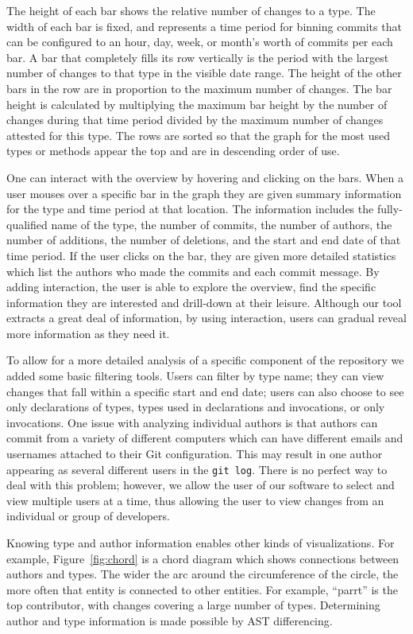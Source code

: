 The height of each bar shows the relative number of changes to a type. The width of each bar is fixed, and represents a time period for binning commits that can be configured to an hour, day, week, or month's worth of commits per each bar.  A bar that completely fills its row vertically is the period with the largest number of changes to that type in the visible date range. The height of the other bars in the row are in proportion to the maximum number of changes. The bar height is calculated by multiplying the maximum bar height by the number of changes during that time period divided by the maximum number of changes attested for this type. The rows are sorted so that the graph for the most used types or methods appear the top and are in descending order of use.

One can interact with the overview by hovering and clicking on the bars. When a user mouses over a specific bar in the graph they are given summary information for the type and time period at that location. The information includes the fully-qualified name of the type, the number of commits, the number of authors, the number of additions, the number of deletions, and the start and end date of that time period. If the user clicks on the bar, they are given more detailed statistics which list the authors who made the commits and each commit message. By adding interaction, the user is able to explore the overview, find the specific information they are interested and drill-down at their leisure. Although our tool extracts a great deal of information, by using interaction, users can gradual reveal more information as they need it.

To allow for a more detailed analysis of a specific component of the repository we added some basic filtering tools. Users can filter by type name; they can view changes that fall within a specific start and end date; users can also choose to see only declarations of types, types used in declarations and invocations, or only invocations. One issue with analyzing individual authors is that authors can commit from a variety of different computers which can have different emails and usernames attached to their Git configuration. This may result in one author appearing as several different users in the \texttt{git log}. There is no perfect way to deal with this problem; however, we allow the user of our software to select and view multiple users at a time, thus allowing the user to view changes from an individual or group of developers.

Knowing type and author information enables other kinds of visualizations. For example, Figure~\ref{fig:chord} is a chord diagram which shows connections between authors and types. The wider the arc around the circumference of the circle, the more often that entity is connected to other entities. For example, ``parrt'' is the top contributor, with changes covering a large number of types. Determining author and type information is made possible by AST differencing.

